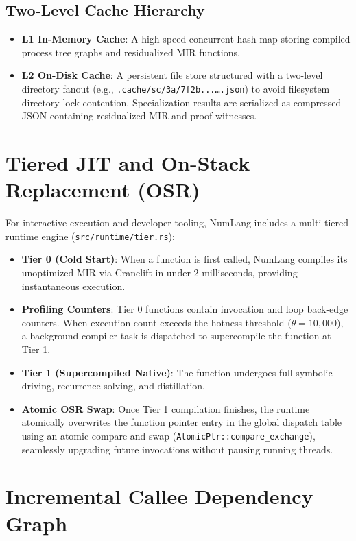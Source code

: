 \subsection{Two-Level Cache Hierarchy}
\begin{itemize}
    \item \textbf{L1 In-Memory Cache}: A high-speed concurrent hash map storing compiled process tree graphs and residualized MIR functions.
    \item \textbf{L2 On-Disk Cache}: A persistent file store structured with a two-level directory fanout (e.g., \texttt{.cache/sc/3a/7f2b...\dots.json}) to avoid filesystem directory lock contention. Specialization results are serialized as compressed JSON containing residualized MIR and proof witnesses.
\end{itemize}

\section{Tiered JIT and On-Stack Replacement (OSR)}
\label{sec:arch:tiered_jit}

For interactive execution and developer tooling, NumLang includes a multi-tiered runtime engine (\texttt{src/runtime/tier.rs}):

\begin{itemize}
    \item \textbf{Tier 0 (Cold Start)}: When a function is first called, NumLang compiles its unoptimized MIR via Cranelift in under 2 milliseconds, providing instantaneous execution.
    \item \textbf{Profiling Counters}: Tier 0 functions contain invocation and loop back-edge counters. When execution count exceeds the hotness threshold ($\theta = 10,000$), a background compiler task is dispatched to supercompile the function at Tier 1.
    \item \textbf{Tier 1 (Supercompiled Native)}: The function undergoes full symbolic driving, recurrence solving, and distillation.
    \item \textbf{Atomic OSR Swap}: Once Tier 1 compilation finishes, the runtime atomically overwrites the function pointer entry in the global dispatch table using an atomic compare-and-swap (\texttt{AtomicPtr::compare\_exchange}), seamlessly upgrading future invocations without pausing running threads.
\end{itemize}

\section{Incremental Callee Dependency Graph}
\label{sec:arch:incremental}

